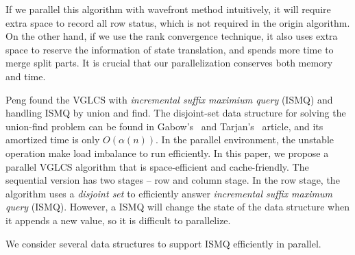 If we parallel this algorithm with wavefront method
intuitively, it will require extra space to record all row status,
which is not required in the origin algorithm.  On the other hand, if
we use the rank convergence technique, it also uses extra space to
reserve the information of state translation, and spends more time to
merge split parts.  It is crucial that our parallelization conserves
both memory and time.

\iffalse 序列算法的空間複雜度為 $O(nm)$。若使用波前平行，需要同時維護橫
向的所有狀態，需要多付出一倍的空間量。若加入 Rank Convergence 的想法拓
展出，勢必要記錄轉移的狀態，需要耗費更多的記憶體空間，用以在最後階段合
併所用。\fi

Peng found the VGLCS with {\em incremental suffix maximium query} (ISMQ)
and handling ISMQ by union and find.  The disjoint-set data structure
for solving the union-find problem can be found in
Gabow's~\cite{Gabow1983ALA} and Tarjan's~\cite{Tarjan1975EfficiencyOA}
article, and its amortized time is only $O(\alpha(n))$.  In the parallel
environment, the unstable operation make load imbalance to run
efficiently.  In this paper, we propose a parallel VGLCS algorithm that
is space-efficient and cache-friendly.  The sequential version has two
stages -- row and column stage.  In the row stage, the algorithm uses a
{\em disjoint set} to efficiently answer {\em incremental suffix
maximum query} (ISMQ).  However, a ISMQ will change the state of the
data structure when it appends a new value, so it is difficult to
parallelize.


\iffalse 這裡我們傾向空間複雜度常數小且針對快取友善設計算法。平行算法主
要分成兩個階段－縱向和橫向階段，縱向階段為數個列的後綴極值查找，橫向階
段在行上運行 $n$ 個元素和 $n$ 組詢問。在橫向階段，我們需要解決增長後綴
最大值查找 (\emph{incremental suffix maximum query}, ISMQ)易於實作的并
查集支持單一操作 $O(\alpha(n))$。然而，在過程中每插入一個元素便改動數據
結構以支持下一個後綴詢問，這部分使得查詢難以平行化。為消除資料相依性，
我們找到幾種區間詢問的替代方案。如：\fi

We consider several data structures to support ISMQ efficiently in
parallel.

